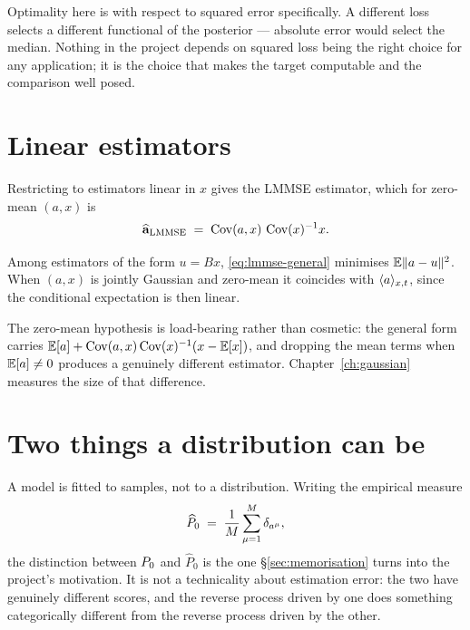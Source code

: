 \begin{intuition}
Optimality here is with respect to squared error specifically. A different loss selects a
different functional of the posterior --- absolute error would select the median. Nothing in the
project depends on squared loss being the right choice for any application; it is the choice that
makes the target computable and the comparison well posed.
\end{intuition}

\section{Linear estimators}
\label{sec:lmmse-intro}

Restricting to estimators linear in $x$ gives the LMMSE estimator, which for zero-mean
$(a,x)$ is
\begin{equation}
\label{eq:lmmse-general}
\widehat{\mathbf{a}}_{\mathrm{LMMSE}} \;=\; \operatorname{Cov}(a,x)\,\operatorname{Cov}(x)^{-1} x .
\end{equation}

\begin{proposition}
\label{prop:lmmse-general}
Among estimators of the form $u = Bx$, \eqref{eq:lmmse-general} minimises $\mathbb{E}\|a-u\|^2$. When
$(a,x)$ is jointly Gaussian and zero-mean it coincides with $\langle a \rangle_{x,t}$, since the conditional
expectation is then linear.
\end{proposition}

The zero-mean hypothesis is load-bearing rather than cosmetic: the general form carries
$\mathbb{E}[a] + \operatorname{Cov}(a,x)\operatorname{Cov}(x)^{-1}(x-\mathbb{E}[x])$, and dropping the mean terms when $\mathbb{E}[a]\neq0$ produces
a genuinely different estimator. Chapter~\ref{ch:gaussian} measures the size of that difference.

\section{Two things a distribution can be}
\label{sec:empirical}

A model is fitted to samples, not to a distribution. Writing the empirical measure
\begin{equation}
\label{eq:empirical}
\widehat{P}_0 \;=\; \frac{1}{M}\sum_{\mu=1}^{M} \delta_{a^\mu},
\end{equation}
the distinction between $P_0$ and $\widehat{P}_0$ is the one \S\ref{sec:memorisation} turns into
the project's motivation. It is not a technicality about estimation error: the two have
genuinely different scores, and the reverse process driven by one does something categorically
different from the reverse process driven by the other.

